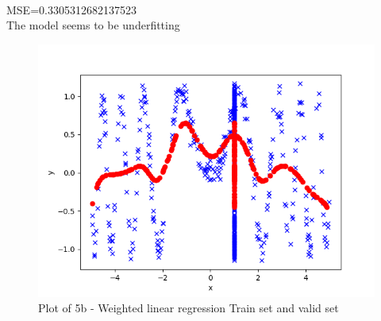 \begin{answer}\\
MSE=0.3305312682137523\\
The model seems to be underfitting\\
\begin{figure}
  \includegraphics[width=\linewidth]{../src/output/p05b_plot.png}
  \caption{Plot of 5b - Weighted linear regression Train set and valid set}
  \label{fig:Plot of 5b - Weighted linear regression Train set and valid set}
\end{figure}\\
\end{answer}
